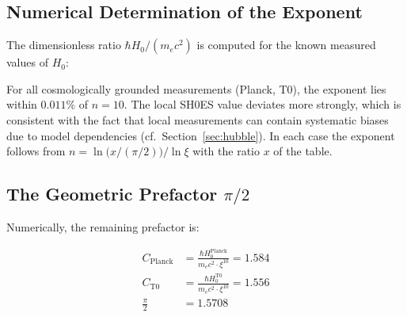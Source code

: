 \subsection{Numerical Determination of the Exponent}

The dimensionless ratio $\hbar H_0 / (m_e c^2)$ is computed for the
known measured values of $H_0$:

\begin{table}[H]
    \centering
    \caption{Dimensionless ratio $\hbar H_0 / m_e c^2$ and the corresponding
    $\xi$ exponent for various $H_0$ measurements.
    The exponent is defined by $\hbar H_0 / m_e c^2 = C \cdot \xi^n$,
    $C \equiv \pi/2$.}
    \label{tab:exponents}
\end{table}

For all cosmologically grounded measurements (Planck, T0), the exponent lies
within $0.011\%$ of $n = 10$. The local SH0ES value deviates more strongly,
which is consistent with the fact that local measurements can contain systematic
biases due to model dependencies (cf.\ Section~\ref{sec:hubble}).
In each case the exponent follows from $n = \ln\bigl(x/(\pi/2)\bigr)/\ln\xi$ with the
ratio $x$ of the table.

\subsection{The Geometric Prefactor \texorpdfstring{$\pi/2$}{pi/2}}

Numerically, the remaining prefactor is:

\begin{align}
    C_{\text{Planck}} &= \frac{\hbar H_0^{\text{Planck}}}{m_e c^2 \cdot \xi^{10}}
    = 1.584 \\[4pt]
    C_{\text{T0}}     &= \frac{\hbar H_0^{\text{T0}}}{m_e c^2 \cdot \xi^{10}}
    = 1.556 \\[4pt]
    \frac{\pi}{2}     &= 1.5708
\end{align}

